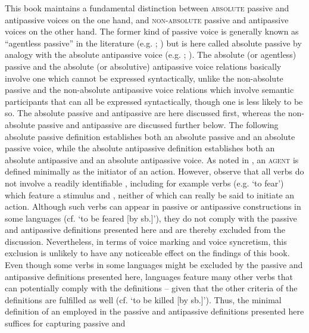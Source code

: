This book maintains a fundamental distinction between \textsc{absolute} passive and antipassive voices on the one hand, and \textsc{non-absolute} passive and antipassive voices on the other hand. The former kind of passive voice is generally known as “agentless passive” in the literature (e.g. \citealt[7]{dixon:aikhenvald:2000}; \citealt[374]{kulikov:2010}) but is here called absolute passive by analogy with the absolute antipassive voice (e.g. \citealt[1131]{haspelmath:muller-bardey:2004}; \citealt[98]{malchukov:2015}). The absolute (or agentless) passive and the absolute (or absolutive) antipassive voice relations basically involve one  which cannot be expressed syntactically, unlike the non-absolute passive and the non-absolute antipassive voice relations which involve semantic participants that can all be expressed syntactically, though one  is less likely to be so. The absolute passive and antipassive are here discussed first, whereas the non-absolute passive and antipassive are discussed further below. The following absolute passive definition establishes both an absolute passive  and an absolute passive voice, while the absolute antipassive definition establishes both an absolute antipassive  and an absolute antipassive voice. As noted in , an \textsc{agent} is defined minimally as the initiator of an action. However, observe that all verbs do not involve a readily identifiable , including for example  verbs (e.g. ‘to fear’) which feature a stimulus and , neither of which can really be said to initiate an action. Although such verbs can appear in  passive or antipassive constructions in some languages (cf.   ‘to be feared [by sb.]’), they do not comply with the passive and antipassive definitions presented here and are thereby excluded from the discussion. Nevertheless, in terms of voice marking and voice syncretism, this exclusion is unlikely to have any noticeable effect on the findings of this book. Even though some verbs in some languages might be excluded by the passive and antipassive definitions presented here, languages feature many other verbs that can potentially comply with the definitions -- given that the other criteria of the definitions are fulfilled as well (cf.   ‘to be killed [by sb.]’). Thus, the minimal definition of an  employed in the passive and antipassive definitions presented here suffices for capturing passive and 